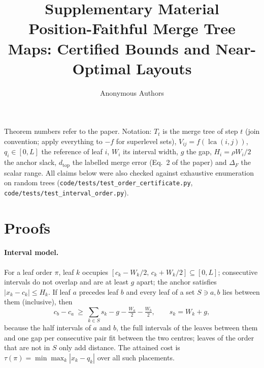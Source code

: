 \documentclass[10pt]{article}
\title{Supplementary Material\\[2pt]\large Position-Faithful Merge Tree Maps: Certified Bounds and Near-Optimal Layouts}
\author{Anonymous Authors}
\date{}
\newcommand{\dtop}{d_{\mathrm{top}}}
\newcommand{\lca}{\operatorname{lca}}
\begin{document}
\sloppy
\maketitle

Theorem numbers refer to the paper. Notation: $T_t$ is the merge tree of step $t$ (join convention; apply everything to $-f$ for superlevel sets), $V_{ij}=f(\lca(i,j))$, $q_i\in[0,L]$ the reference of leaf $i$, $W_i$ its interval width, $g$ the gap, $H_i=\rho W_i/2$ the anchor slack, $\dtop$ the labelled merge error (Eq.~2 of the paper) and $\Delta_F$ the scalar range. All claims below were also checked against exhaustive enumeration on random trees (\texttt{code/tests/test\_order\_certificate.py}, \texttt{code/tests/test\_interval\_order.py}).

\section{Proofs}

\paragraph{Interval model.} For a leaf order $\pi$, leaf $k$ occupies $[c_k-W_k/2,\,c_k+W_k/2]\subseteq[0,L]$; consecutive intervals do not overlap and are at least $g$ apart; the anchor satisfies $|x_k-c_k|\le H_k$. If leaf $a$ precedes leaf $b$ and every leaf of a set $S\ni a,b$ lies between them (inclusive), then
\begin{equation}\label{eq:pack}
c_b-c_a\ \ge\ \sum_{k\in S}s_k-g-\tfrac{W_a}{2}-\tfrac{W_b}{2},\qquad s_k=W_k+g,
\end{equation}
because the half intervals of $a$ and $b$, the full intervals of the leaves between them and one gap per consecutive pair fit between the two centres; leaves of the order that are not in $S$ only add distance. The attained cost is $\tau(\pi)=\min\max_k|x_k-q_k|$ over all such placements.
\end{document}
